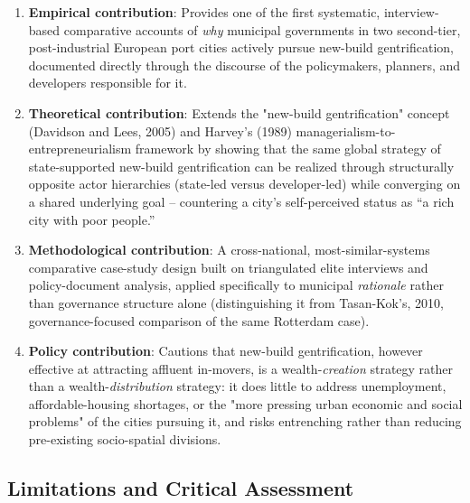 \begin{enumerate}
  \item \textbf{Empirical contribution}: Provides one of the first systematic, interview-based comparative accounts of \emph{why} municipal governments in two second-tier, post-industrial European port cities actively pursue new-build gentrification, documented directly through the discourse of the policymakers, planners, and developers responsible for it.
  \item \textbf{Theoretical contribution}: Extends the "new-build gentrification" concept (Davidson and Lees, 2005) and Harvey's (1989) managerialism-to-entrepreneurialism framework by showing that the same global strategy of state-supported new-build gentrification can be realized through structurally opposite actor hierarchies (state-led versus developer-led) while converging on a shared underlying goal -- countering a city's self-perceived status as ``a rich city with poor people.''
  \item \textbf{Methodological contribution}: A cross-national, most-similar-systems comparative case-study design built on triangulated elite interviews and policy-document analysis, applied specifically to municipal \emph{rationale} rather than governance structure alone (distinguishing it from Tasan-Kok's, 2010, governance-focused comparison of the same Rotterdam case).
  \item \textbf{Policy contribution}: Cautions that new-build gentrification, however effective at attracting affluent in-movers, is a wealth-\emph{creation} strategy rather than a wealth-\emph{distribution} strategy: it does little to address unemployment, affordable-housing shortages, or the "more pressing urban economic and social problems" of the cities pursuing it, and risks entrenching rather than reducing pre-existing socio-spatial divisions.
\end{enumerate}

\subsection*{Limitations and Critical Assessment}

